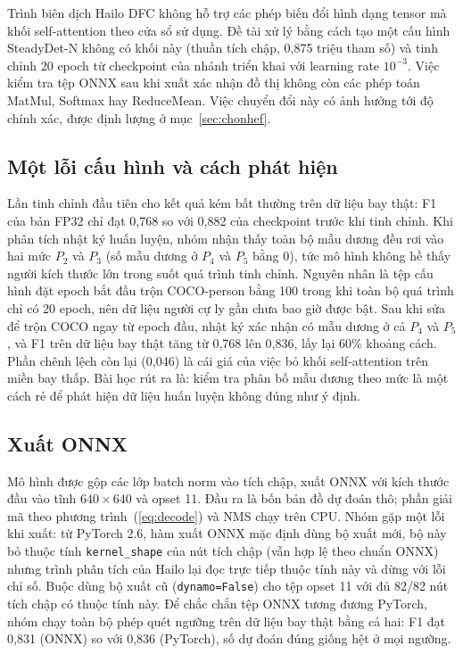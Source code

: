 Trình biên dịch Hailo DFC không hỗ trợ các phép biến đổi hình dạng tensor mà khối self-attention theo cửa sổ sử dụng. Đề tài xử lý bằng cách tạo một cấu hình SteadyDet-N không có khối này (thuần tích chập, 0,875 triệu tham số) và tinh chỉnh 20 epoch từ checkpoint của nhánh triển khai với learning rate $10^{-3}$. Việc kiểm tra tệp ONNX sau khi xuất xác nhận đồ thị không còn các phép toán MatMul, Softmax hay ReduceMean. Việc chuyển đổi này có ảnh hưởng tới độ chính xác, được định lượng ở mục~\ref{sec:chonhef}.

\subsection{Một lỗi cấu hình và cách phát hiện}

Lần tinh chỉnh đầu tiên cho kết quả kém bất thường trên dữ liệu bay thật: F1 của bản FP32 chỉ đạt 0,768 so với 0,882 của checkpoint trước khi tinh chỉnh. Khi phân tích nhật ký huấn luyện, nhóm nhận thấy toàn bộ mẫu dương đều rơi vào hai mức $P_2$ và $P_3$ (số mẫu dương ở $P_4$ và $P_5$ bằng 0), tức mô hình không hề thấy người kích thước lớn trong suốt quá trình tinh chỉnh. Nguyên nhân là tệp cấu hình đặt epoch bắt đầu trộn COCO-person bằng 100 trong khi toàn bộ quá trình chỉ có 20 epoch, nên dữ liệu người cự ly gần chưa bao giờ được bật. Sau khi sửa để trộn COCO ngay từ epoch đầu, nhật ký xác nhận có mẫu dương ở cả $P_4$ và $P_5$, và F1 trên dữ liệu bay thật tăng từ 0,768 lên 0,836, lấy lại 60\% khoảng cách. Phần chênh lệch còn lại (0,046) là cái giá của việc bỏ khối self-attention trên miền bay thấp. Bài học rút ra là: kiểm tra phân bố mẫu dương theo mức là một cách rẻ để phát hiện dữ liệu huấn luyện không đúng như ý định.

\subsection{Xuất ONNX}

Mô hình được gộp các lớp batch norm vào tích chập, xuất ONNX với kích thước đầu vào tĩnh $640\times640$ và opset 11. Đầu ra là bốn bản đồ dự đoán thô; phần giải mã theo phương trình~(\ref{eq:decode}) và NMS chạy trên CPU. Nhóm gặp một lỗi khi xuất: từ PyTorch 2.6, hàm xuất ONNX mặc định dùng bộ xuất mới, bộ này bỏ thuộc tính \texttt{kernel\_shape} của nút tích chập (vẫn hợp lệ theo chuẩn ONNX) nhưng trình phân tích của Hailo lại đọc trực tiếp thuộc tính này và dừng với lỗi chỉ số. Buộc dùng bộ xuất cũ (\texttt{dynamo=False}) cho tệp opset 11 với đủ 82/82 nút tích chập có thuộc tính này. Để chắc chắn tệp ONNX tương đương PyTorch, nhóm chạy toàn bộ phép quét ngưỡng trên dữ liệu bay thật bằng cả hai: F1 đạt 0,831 (ONNX) so với 0,836 (PyTorch), số dự đoán đúng giống hệt ở mọi ngưỡng.

